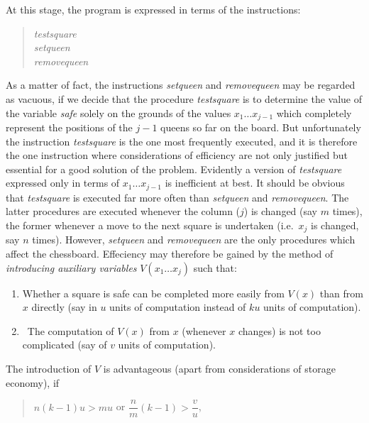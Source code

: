 At this stage, the program is expressed in terms of the instructions:

\begin{quote}
\emph{testsquare}\\
\emph{setqueen}\\
\emph{removequeen}\\
\end{quote}

As a matter of fact, the instructions \emph{setqueen} and \emph{removequeen}
may be regarded as vacuous, if we decide that the procedure \emph{testsquare}
is to determine the value of the variable \emph{safe} solely on the grounds of
the values $x_1 \ldots x_{j-1}$ which completely represent the positions of the
$j - 1$ queens so far on the board.  But unfortunately the instruction
\emph{testsquare} is the one most frequently executed, and it is therefore the
one instruction where considerations of efficiency are not only justified but
essential for a good solution of the problem.  Evidently a version of
\emph{testsquare} expressed only in terms of $x_1 \ldots x_{j-1}$ is
inefficient at best.  It should be obvious that \emph{testsquare} is executed
far more often than \emph{setqueen} and \emph{removequeen}.  The latter
procedures are executed whenever the column ($j$) is changed (say $m$ times),
the former whenever a move to the next square is undertaken (i.e.\ $x_j$ is
changed, say $n$ times).  However, \emph{setqueen} and \emph{removequeen} are
the only procedures which affect the chessboard.  Effeciency may therefore be
gained by the method of \emph{introducing auxiliary variables} $V(x_1 \ldots
x_j)$ such that:

\begin{enumerate}
    \item Whether a square is safe can be completed more easily from $V(x)$
          than from $x$ directly (say in $u$ units of computation instead of
          $ku$ units of computation).

    \item The computation of $V(x)$ from $x$ (whenever $x$ changes) is not too
          complicated (say of $v$ units of computation).
\end{enumerate}

The introduction of $V$ is advantageous (apart from considerations of storage
economy), if

\begin{quote}
$n(k - 1)u > mu$ \qquad or \qquad $\dfrac{n}{m}(k - 1) > \dfrac{v}{u}$,
\end{quote}

